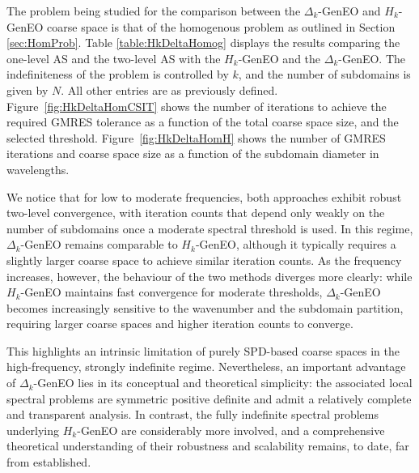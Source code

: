 \documentclass[preprint,3p,times]{elsarticle}
\theoremstyle{definition}
\numberwithin{equation}{section}
\begin{document}
{The problem being studied for the comparison between the $\Delta_k$-GenEO and $H_k$-GenEO coarse space is that of the homogenous problem as outlined in Section \ref{sec:HomProb}. Table \ref{table:HkDeltaHomog} displays the results comparing the one-level AS and the two-level AS with the $H_k$-GenEO and the $\Delta_k$-GenEO. The indefiniteness of the problem is controlled by $k$, and the number of subdomains is given by $N$. All other entries are as previously defined. Figure~\ref{fig:HkDeltaHomCSIT} shows the number of iterations to achieve the required GMRES tolerance as a function of the total coarse space size, and the selected threshold. Figure~\ref{fig:HkDeltaHomH} shows the number of GMRES iterations and coarse space size as a function of the subdomain diameter in wavelengths.
}

{
We notice that for low to moderate frequencies, both approaches exhibit robust two-level convergence, with iteration counts that depend only weakly on the number of subdomains once a moderate spectral threshold is used. In this regime, $\Delta_k$-GenEO remains comparable to $H_k$-GenEO, although it typically requires a slightly larger coarse space to achieve similar iteration counts. As the frequency increases, however, the behaviour of the two methods diverges more clearly: while $H_k$-GenEO maintains fast convergence for moderate thresholds, $\Delta_k$-GenEO becomes increasingly sensitive to the wavenumber and the subdomain partition, requiring larger coarse spaces and higher iteration counts to converge. }

{This highlights an intrinsic limitation of purely SPD-based coarse spaces in the high-frequency, strongly indefinite regime. Nevertheless, an important advantage of $\Delta_k$-GenEO lies in its conceptual and theoretical simplicity: the associated local spectral problems are symmetric positive definite and admit a relatively complete and transparent analysis. In contrast, the fully indefinite spectral problems underlying $H_k$-GenEO are considerably more involved, and a comprehensive theoretical understanding of their robustness and scalability remains, to date, far from established.
}
\end{document}

